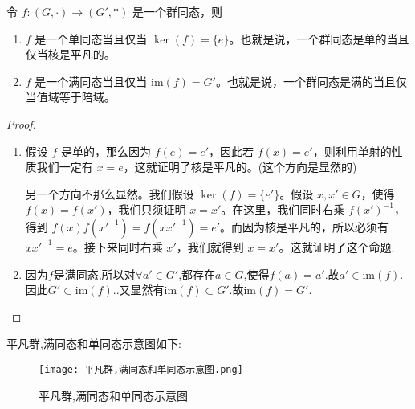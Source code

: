 \documentclass[../../main.tex]{subfiles}
\begin{document}
\begin{proposition}\label{proposition:一个群同态是单的当且仅当核是平凡的}
令 $f:(G,\cdot)\to (G',*)$ 是一个群同态，则
\begin{enumerate}
\item $f$ 是一个单同态当且仅当 $\ker(f)=\{e\}$。也就是说，一个群同态是单的当且仅当核是平凡的。

\item $f$ 是一个满同态当且仅当 $ \mathrm{im}(f)=G'$。也就是说，一个群同态是满的当且仅当值域等于陪域。
\end{enumerate}
\end{proposition}
\begin{proof}
\begin{enumerate}
\item 假设 $f$ 是单的，那么因为 $f(e)=e'$，因此若 $f(x)=e'$，则利用单射的性质我们一定有 $x = e$，这就证明了核是平凡的。(这个方向是显然的)

另一个方向不那么显然。我们假设 $\ker(f)=\{e'\}$。假设 $x,x'\in G$，使得 $f(x)=f(x')$，我们只须证明 $x = x'$。在这里，我们同时右乘 $f(x')^{-1}$，得到 $f(x)f(x'^{-1})=f(xx'^{-1})=e'$。而因为核是平凡的，所以必须有 $xx'^{-1}=e$。接下来同时右乘 $x'$，我们就得到 $x = x'$。这就证明了这个命题.

\item 因为$f$是满同态,所以对$\forall a'\in G'$,都存在$a\in G$,使得$f(a)=a'.$故$a'\in \mathrm{im}(f)$.因此$G' \subset \mathrm{im}(f).$.又显然有$\mathrm{im}(f) \subset G'.$故$\mathrm{im}(f) = G'.$
\end{enumerate}
\end{proof}
\begin{note}
平凡群,满同态和单同态示意图如下:
\begin{figure}[H]
\centering
\texttt{[image: 平凡群,满同态和单同态示意图.png]}
\label{figure:平凡群,满同态和单同态示意图}
\caption{平凡群,满同态和单同态示意图}
\end{figure}
\end{note}
\end{document}

